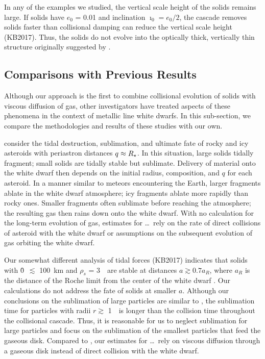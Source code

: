 \documentclass[12pt,preprint]{aastex}
\begin{document}
In any of the examples we studied, the vertical scale height of the solids remains large.
If solids have $e_0$ = 0.01 and inclination $\imath_0 = e_0 / 2$, the cascade removes 
solids faster than collisional damping can reduce the vertical scale height (KB2017). 
Thus, the solids do not evolve into the optically thick, vertically thin structure 
originally suggested by \citet{jura2003}.

\subsection{Comparisons with Previous Results}
\label{sec: disc-comp}

Although our approach is the first to combine collisional evolution of solids with 
viscous diffusion of gas, other investigators have treated aspects of these phenomena 
in the context of metallic line white dwarfs. In this sub-section, we compare the
methodologies and results of these studies with our own.

\citet{brown2017} consider the tidal destruction, sublimation, and ultimate fate of rocky 
and icy asteroids with periastron distances $q \approx \rstar$. In this situation, large
solids tidally fragment; small solids are tidally stable but sublimate. Delivery of material 
onto the white dwarf then depends on the initial radius, composition, and $q$ for each 
asteroid.  In a manner similar to meteors encountering the Earth, larger fragments ablate 
in the white dwarf atmosphere; icy fragments ablate more rapidly than rocky ones. Smaller 
fragments often sublimate before reaching the atmosphere; the resulting gas then rains down 
onto the white dwarf. With no calculation for the long-term evolution of gas, estimates for 
\mdots\ rely on the rate of direct collisions of asteroid with the white dwarf or assumptions
on the subsequent evolution of gas orbiting the white dwarf.

Our somewhat different analysis of tidal forces (KB2017) indicates that solids with 
\r0\ $\lesssim$ 100~km and $\rho_s$ = 3~\gcmc\ are stable at distances $a \gtrsim 0.7 a_R$, 
where $a_R$ is the distance of the Roche limit from the center of the white dwarf 
\citep[see also][]{veras2017}.  Our calculations do not address the fate of solids at 
smaller $a$. Although our conclusions on the sublimation of large particles are similar
to \citet{brown2017}, the sublimation time for particles with radii $r \gtrsim$ 1~\mum\ is 
longer than the collision time throughout the collisional cascade. Thus, it is reasonable 
for us to neglect sublimation for large particles and focus on the sublimation of the 
smallest particles that feed the gaseous disk. Compared to \citet{brown2017}, our estimates 
for \mdots\ rely on viscous diffusion through a gaseous disk instead of direct collision 
with the white dwarf.
\end{document}
